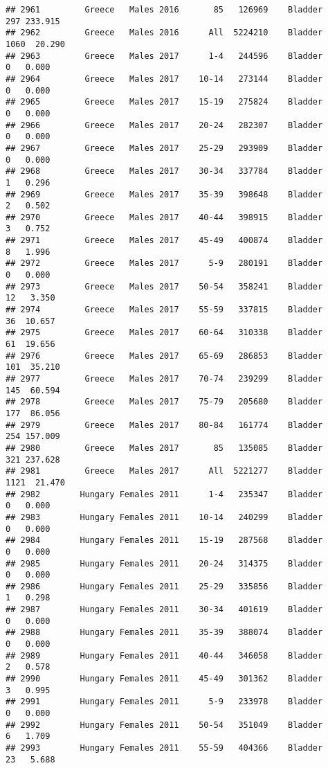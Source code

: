 \documentclass[
]{article}
\begin{document}
\begin{verbatim}
## 2961         Greece   Males 2016       85   126969    Bladder    297 233.915
## 2962         Greece   Males 2016      All  5224210    Bladder   1060  20.290
## 2963         Greece   Males 2017      1-4   244596    Bladder      0   0.000
## 2964         Greece   Males 2017    10-14   273144    Bladder      0   0.000
## 2965         Greece   Males 2017    15-19   275824    Bladder      0   0.000
## 2966         Greece   Males 2017    20-24   282307    Bladder      0   0.000
## 2967         Greece   Males 2017    25-29   293909    Bladder      0   0.000
## 2968         Greece   Males 2017    30-34   337784    Bladder      1   0.296
## 2969         Greece   Males 2017    35-39   398648    Bladder      2   0.502
## 2970         Greece   Males 2017    40-44   398915    Bladder      3   0.752
## 2971         Greece   Males 2017    45-49   400874    Bladder      8   1.996
## 2972         Greece   Males 2017      5-9   280191    Bladder      0   0.000
## 2973         Greece   Males 2017    50-54   358241    Bladder     12   3.350
## 2974         Greece   Males 2017    55-59   337815    Bladder     36  10.657
## 2975         Greece   Males 2017    60-64   310338    Bladder     61  19.656
## 2976         Greece   Males 2017    65-69   286853    Bladder    101  35.210
## 2977         Greece   Males 2017    70-74   239299    Bladder    145  60.594
## 2978         Greece   Males 2017    75-79   205680    Bladder    177  86.056
## 2979         Greece   Males 2017    80-84   161774    Bladder    254 157.009
## 2980         Greece   Males 2017       85   135085    Bladder    321 237.628
## 2981         Greece   Males 2017      All  5221277    Bladder   1121  21.470
## 2982        Hungary Females 2011      1-4   235347    Bladder      0   0.000
## 2983        Hungary Females 2011    10-14   240299    Bladder      0   0.000
## 2984        Hungary Females 2011    15-19   287568    Bladder      0   0.000
## 2985        Hungary Females 2011    20-24   314375    Bladder      0   0.000
## 2986        Hungary Females 2011    25-29   335856    Bladder      1   0.298
## 2987        Hungary Females 2011    30-34   401619    Bladder      0   0.000
## 2988        Hungary Females 2011    35-39   388074    Bladder      0   0.000
## 2989        Hungary Females 2011    40-44   346058    Bladder      2   0.578
## 2990        Hungary Females 2011    45-49   301362    Bladder      3   0.995
## 2991        Hungary Females 2011      5-9   233978    Bladder      0   0.000
## 2992        Hungary Females 2011    50-54   351049    Bladder      6   1.709
## 2993        Hungary Females 2011    55-59   404366    Bladder     23   5.688

\end{verbatim}
\end{document}
